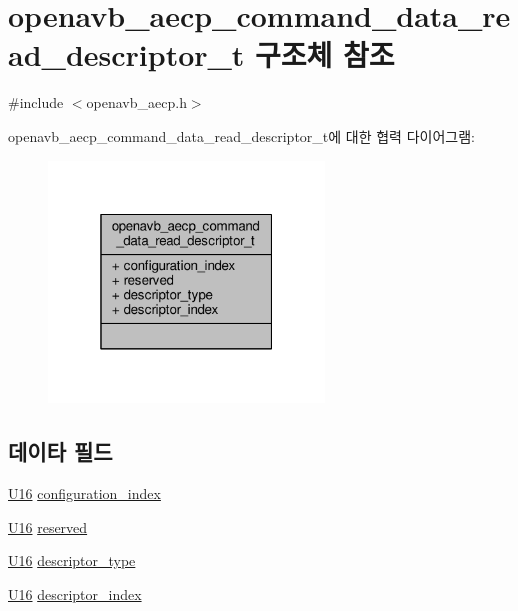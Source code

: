 \hypertarget{structopenavb__aecp__command__data__read__descriptor__t}{}\section{openavb\+\_\+aecp\+\_\+command\+\_\+data\+\_\+read\+\_\+descriptor\+\_\+t 구조체 참조}
\label{structopenavb__aecp__command__data__read__descriptor__t}


{\ttfamily \#include $<$openavb\+\_\+aecp.\+h$>$}



openavb\+\_\+aecp\+\_\+command\+\_\+data\+\_\+read\+\_\+descriptor\+\_\+t에 대한 협력 다이어그램\+:
\nopagebreak
\begin{figure}[H]
\begin{center}
\leavevmode
\includegraphics[width=208pt]{structopenavb__aecp__command__data__read__descriptor__t__coll__graph}
\end{center}
\end{figure}
\subsection*{데이타 필드}
\begin{DoxyCompactItemize}
\item 
\hyperlink{openavb__types__base__pub_8h_a0a0a322d5fa4a546d293a77ba8b4a71f}{U16} \hyperlink{structopenavb__aecp__command__data__read__descriptor__t_aa4ea2d17e7732c1a15797c10fa40f9bb}{configuration\+\_\+index}
\item 
\hyperlink{openavb__types__base__pub_8h_a0a0a322d5fa4a546d293a77ba8b4a71f}{U16} \hyperlink{structopenavb__aecp__command__data__read__descriptor__t_ac15a687d635cc969d1bfab4d96858b77}{reserved}
\item 
\hyperlink{openavb__types__base__pub_8h_a0a0a322d5fa4a546d293a77ba8b4a71f}{U16} \hyperlink{structopenavb__aecp__command__data__read__descriptor__t_a1e231d7874aada5925b29affc76782cc}{descriptor\+\_\+type}
\item 
\hyperlink{openavb__types__base__pub_8h_a0a0a322d5fa4a546d293a77ba8b4a71f}{U16} \hyperlink{structopenavb__aecp__command__data__read__descriptor__t_ab26fb363c24b9a2a4391f9171c981b08}{descriptor\+\_\+index}
\end{DoxyCompactItemize}


